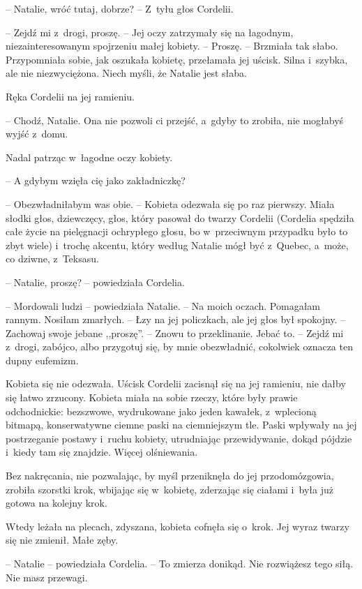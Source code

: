 \documentclass[oneside,polish,11pt,sfheadings]{mwbk}
\begin{document}
-- Natalie, wróć tutaj, dobrze? -- Z~tyłu głos Cordelii.

-- Zejdź mi z~drogi, proszę. -- Jej oczy zatrzymały się na łagodnym,
niezainteresowanym spojrzeniu małej kobiety. -- Proszę. -- Brzmiała tak
słabo. Przypomniała sobie, jak oszukała kobietę, przełamała jej uścisk.
Silna i~szybka, ale nie niezwyciężona. Niech myśli, że Natalie jest
słaba.

Ręka Cordelii na jej ramieniu. 

-- Chodź, Natalie. Ona nie pozwoli ci
przejść, a~gdyby to zrobiła, nie mogłabyś wyjść z~domu.

Nadal patrząc w~łagodne oczy kobiety. 

-- A gdybym wzięła cię jako
zakładniczkę?

-- Obezwładniłabym was obie. -- Kobieta odezwała się po raz pierwszy.
Miała słodki głos, dziewczęcy, głos, który pasował do twarzy Cordelii
(Cordelia spędziła całe życie na pielęgnacji ochrypłego głosu, bo w~przeciwnym przypadku było to zbyt wiele) i~trochę akcentu, który według
Natalie mógł być z~Quebec, a~może, co dziwne, z~Teksasu.

-- Natalie, proszę? -- powiedziała Cordelia.

-- Mordowali ludzi -- powiedziała Natalie. -- Na moich oczach. Pomagałam
rannym. Nosiłam zmarłych. -- Łzy na jej policzkach, ale jej głos był
spokojny. -- Zachowaj swoje jebane ,,proszę''. -- Znowu to przeklinanie.
Jebać to. -- Zejdź mi z~drogi, zabójco, albo przygotuj się, by mnie
obezwładnić, cokolwiek oznacza ten dupny eufemizm.

Kobieta się nie odezwała. Uścisk Cordelii zacisnął się na jej ramieniu,
nie dałby się łatwo zrzucony. Kobieta miała na sobie rzeczy, które były
prawie odchodnickie: bezszwowe, wydrukowane jako jeden kawałek, z~wplecioną bitmapą, konserwatywne ciemne paski na ciemniejszym tle. Paski
wpływały na jej postrzeganie postawy i~ruchu kobiety, utrudniając
przewidywanie, dokąd pójdzie i~kiedy tam się znajdzie. Więcej
olśniewania.

Bez nakręcania, nie pozwalając, by myśl przeniknęła do jej
przodomózgowia, zrobiła szorstki krok, wbijając się w~kobietę, zderzając
się ciałami i~była już gotowa na kolejny krok.

Wtedy leżała na plecach, zdyszana, kobieta cofnęła się o~krok. Jej wyraz
twarzy się nie zmienił. Małe zęby.

-- Natalie -- powiedziała Cordelia. -- To zmierza donikąd. Nie rozwiążesz
tego siłą. Nie masz przewagi.
\end{document}
